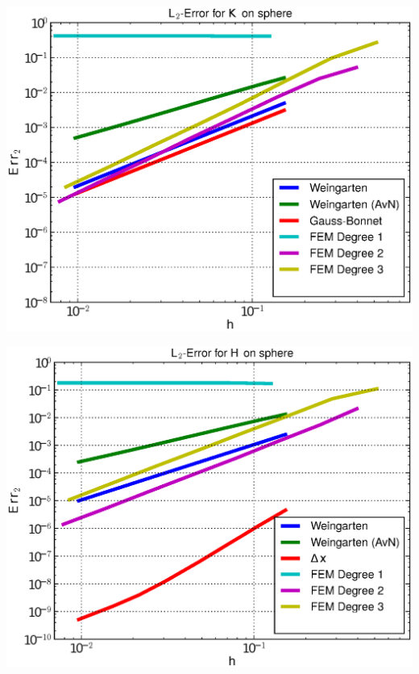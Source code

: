 \documentclass[handout]{beamer}
\begin{document}
\begin{frame}
\begin{overprint}
\begin{minipage}[t]{0.49\textwidth}
            \centering\includegraphics[width=\textwidth]{bilder/Curvature/sphere/ErrKL2_6.eps}
          \end{minipage}\hfill
          \begin{minipage}[t]{0.49\textwidth}
            \centering\includegraphics[width=\textwidth]{bilder/Curvature/sphere/ErrHL2_6.eps}
          \end{minipage}
          \begin{minipage}[t]{0.49\textwidth}

\end{minipage}
\end{overprint}
\end{frame}
\end{document}
